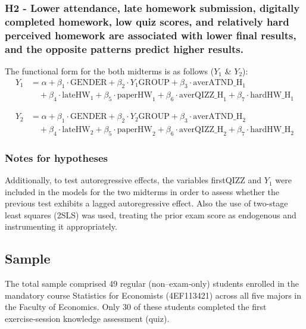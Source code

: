 \documentclass[]{article}
\begin{document}
	\subsubsection{H2 - Lower attendance, late homework submission, digitally completed homework, low quiz scores, and relatively hard perceived homework are associated with lower final results, 	and the opposite patterns predict higher results.}
		
		The functional form for the both midterms is as follows ($Y_1$ \& $Y_2$):
		$$
		\begin{aligned}
			Y_1 &= \alpha + \beta_1 \cdot \text{GENDER} + \beta_2 \cdot Y_1\text{GROUP} + \beta_3 \cdot \text{averATND\_H}_1   \\
			&\quad + \beta_4 \cdot \text{lateHW}_1 + \beta_5 \cdot \text{paperHW}_1  + \beta_6 \cdot \text{averQIZZ\_H}_1 + \beta_7 \cdot \text{hardHW\_H}_1
		\end{aligned}
		$$
		
		$$
		\begin{aligned}
			Y_2 &= \alpha + \beta_1 \cdot \text{GENDER} + \beta_2 \cdot Y_2\text{GROUP} + \beta_3 \cdot \text{averATND\_H}_2   \\
			&\quad + \beta_4 \cdot \text{lateHW}_2 + \beta_5 \cdot \text{paperHW}_2  + \beta_6 \cdot \text{averQIZZ\_H}_2 + \beta_7 \cdot \text{hardHW\_H}_2
		\end{aligned}
		$$
	
	\subsubsection{Notes for hypotheses}
	
	Additionally, to test autoregressive effects, the variables firstQIZZ and $Y_1$ were included in the models for the two midterms in order to assess whether the previous test exhibits a lagged autoregressive effect. Also the use of two-stage least squares (2SLS) was used, treating the prior exam score as endogenous and instrumenting it appropriately.
	
	\subsection{Sample}
	The total sample comprised 49 regular (non–exam‑only) students enrolled in the mandatory course Statistics for Economists (4EF113421) across all five majors in the Faculty of Economics. Only 30 of these students completed the first exercise‑session knowledge assessment (quiz). \\
	
\end{document}
